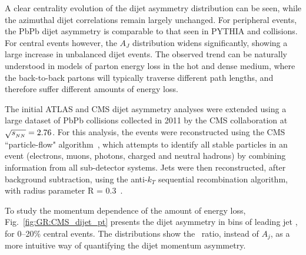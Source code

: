 A clear centrality evolution of the dijet asymmetry distribution can be seen, while the azimuthal
dijet correlations remain largely unchanged. For peripheral events, the PbPb dijet asymmetry
is comparable to that seen in PYTHIA and \pp collisions. For central events however, 
the $A_J$ distribution widens significantly, showing a large increase in unbalanced
dijet events. The observed trend can be naturally understood in models of parton energy
loss in the hot and dense medium, where the back-to-back partons will typically traverse
different path lengths, and therefore suffer different amounts of energy loss.

The initial ATLAS and CMS dijet asymmetry analyses were extended using a large dataset of PbPb collisions
collected in 2011 by the CMS collaboration at $\sqrt{s_{_{NN}}}=2.76$\TeV. For this analysis, the events were 
reconstructed using the  CMS ``particle-flow" algorithm~\cite{CMS-PAS-PFT-10-002,MattPFlow}, 
which attempts to identify all stable particles in an
event (electrons, muons, photons, charged and neutral hadrons)
by combining information from all sub-detector systems.
Jets were then reconstructed, after background subtraction, using the anti-$k_T$ sequential recombination algorithm, 
with radius parameter R = 0.3~\cite{Cacciari:2008gp}.

To study the momentum dependence of the amount of energy loss,
Fig.~\ref{fig:GR:CMS_dijet_pt} presents the dijet asymmetry in bins of leading jet
\pT, for 0--20\% central events. 
The distributions show the \ptrat\ ratio, instead of $A_j$,  as a more intuitive 
way of quantifying the dijet momentum asymmetry.

